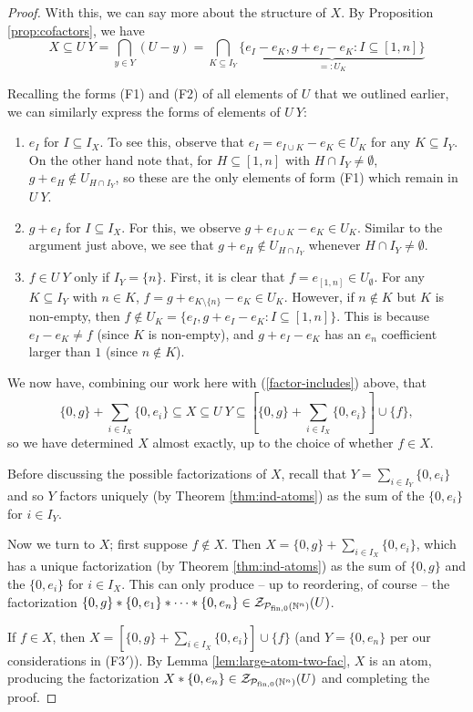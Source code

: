 \begin{proof}
With this, we can say more about the structure of $X$.
By Proposition \ref{prop:cofactors}, we have 
\[X \subseteq U\:Y = \bigcap_{y\in Y}(U-y) = \bigcap_{K\subseteq I_Y} \underbrace{\{e_I - e_K, g+e_I - e_K : I\subseteq [ 1,n ] \}}_{=:U_K} \]

Recalling the forms (F1) and (F2) of all elements of $U$ that we outlined earlier, we can similarly express the forms of elements of $U\:Y$:
\begin{enumerate}[label={\rm (F\arabic{*}$'$)}]
\item $e_I$ for $I\subseteq I_X$. 
To see this, observe that $e_I = e_{I\cup K}-e_K\in U_K$ for any $K\subseteq I_Y$.
On the other hand note that, for $H \subseteq [ 1,n ]$ with $H\cap I_Y\neq \emptyset$, $g+e_H\notin U_{H\cap I_Y}$, so these are the only elements of form (F1) which remain in $U\:Y$.
%
\item $g+e_I$ for $I\subseteq I_X$.
For this, we observe $g+e_{I\cup K} - e_K\in U_K$. 
Similar to the argument just above, we see that $g+e_H\notin U_{H\cap I_Y}$ whenever $H\cap I_Y\neq\emptyset$.
\item $f\in U\:Y$ only if $I_Y = \{n\}$.
First, it is clear that $f = e_{[ 1,n ]} \in U_\emptyset$.
For any $K\subseteq I_Y$ with $n\in K$, $f = g+ e_{K\setminus\{n\}} - e_K\in U_K$.
However, if $n\notin K$ but $K$ is non-empty, then $f\notin U_K = \{e_I, g+e_I-e_K: I\subseteq [1,n]\}$.
This is because $e_I - e_K \neq f$ (since $K$ is non-empty), and $g+e_I-e_K$ has an $e_n$ coefficient larger than $1$ (since $n\notin K$).
\end{enumerate}
We now have, combining our work here with (\ref{factor-includes}) above, that
\[ \{0,g\} + \sum_{i\in I_X}\{0,e_i\} \subseteq X \subseteq U\:Y \subseteq \left[\{0,g\}+\sum_{i\in I_X} \{0,e_i\} \right]\cup\{f\},\]
so we have determined $X$ almost exactly, up to the choice of whether $f\in X$.

Before discussing the possible factorizations of $X$, recall that $Y = \sum_{i\in I_Y} \{0,e_i\}$ and so $Y$ factors uniquely (by Theorem \ref{thm:ind-atoms}) as the sum of the $\{0,e_i\}$ for $i\in I_Y$.

Now we turn to $X$; first suppose $f\notin X$.
Then $X = \{0,g\} +\sum_{i\in I_X} \{0,e_i\}$, which has a unique factorization (by Theorem \ref{thm:ind-atoms}) as the sum of $\{0,g\}$ and the $\{0,e_i\}$ for $i\in I_X$.
This can only produce -- up to reordering, of course -- the factorization $\{0,g\}*\{0,e_1\}*\cdots*\{0,e_n\}\in \mathcal{Z}_{\mathcal{P}_{\textrm{fin}, 0}(\mathbb{N}^n)}(U)$.

If $f\in X$, then $X = \left[\{0,g\}+\sum_{i\in I_X} \{0,e_i\} \right]\cup\{f\}$ (and $Y = \{0,e_n\}$ per our considerations in (F3$'$)).
By Lemma \ref{lem:large-atom-two-fac}, $X$ is an atom, producing the factorization $X*\{0,e_n\}\in \mathcal{Z}_{\mathcal{P}_{\textrm{fin}, 0}(\mathbb{N}^n)}(U)$ and completing the proof.
\end{proof}


